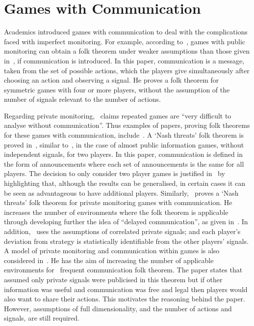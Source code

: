 \section{Games with Communication}\label{sec:Games_with_Communication} 
Academics introduced games with communication to deal with the complications
faced with imperfect monitoring. For example, according to~\cite{Kandori2003},
games with public monitoring can obtain a folk theorem under weaker assumptions
than those given in~\cite{Maskin1994}, if communication is introduced.
In this paper, communication is a message, taken from the set of possible
actions, which the players give simultaneously after choosing an action and
observing a signal. He proves a folk theorem for symmetric games
with four or more players, without the assumption of the number of signals
relevant to the number of actions.

Regarding private monitoring,~\cite{Obara2009} claims repeated games are ``very
difficult to analyse without communication''. Thus examples of papers, proving
folk theorems for these games with communication,
include~\cite{Fudenberg2008,Li2010,Obara2009}. A
`Nash threats' folk theorem is proved in~\cite{Fudenberg2008},
similar to~\cite{Friedman1971}, in the case of almost public information games,
without independent signals, for two players. In this paper, communication is
defined in the form of announcements where each set of announcements is the same
for all players. The decision to only consider two player games is justified
in~\cite{Fudenberg2008} by
highlighting that, although the results can be generalised, in certain cases it
can be seen as advantageous to have additional players. Similarly,~\cite{Obara2009} proves a `Nash threats' folk theorem for private monitoring games
with communication. He increases the number of environments where the folk
theorem is applicable through developing further the idea of ``delayed
communication'', as given in~\cite{Compte1998}. In addition,~\cite{Obara2009}
uses the assumptions of correlated private signals; and each player's deviation
from strategy is statistically identifiable from the other players' signals. A model of private monitoring and communication
within games is also considered in~\cite{Li2010}. He has the aim of increasing the number of applicable
environments for~\cite{Kandori1998} frequent
communication folk theorem. The paper states that~\cite{Kandori1998} assumed only private signals were publicised in this theorem
but if other information was useful and communication was free and legal then
players would also want to share their actions. This motivates the reasoning
behind the paper. However, assumptions of full dimensionality, and the
number of actions and signals, are still required. 

